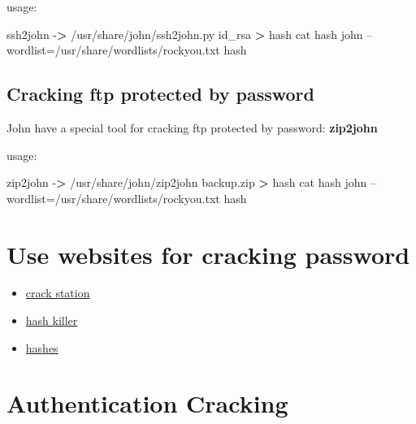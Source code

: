 \documentclass{assets/ipesethesis}
\newenvironment{Shaded}{\begin{snugshade}}{\end{snugshade}}
\newcommand{\ExtensionTok}[1]{#1}
\newcommand{\FunctionTok}[1]{\textcolor[rgb]{0.00,0.00,0.00}{#1}}
\newcommand{\NormalTok}[1]{#1}
\newcommand{\OperatorTok}[1]{\textcolor[rgb]{0.81,0.36,0.00}{\textbf{#1}}}
\providecommand{\tightlist}{%
  \setlength{\itemsep}{0pt}\setlength{\parskip}{0pt}}
\begin{document}
usage:

\begin{Shaded}
\begin{Highlighting}[]
\ExtensionTok{ssh2john}\NormalTok{ -}\OperatorTok{>}\NormalTok{ /usr/share/john/ssh2john.py id_rsa }\OperatorTok{>}\NormalTok{ hash}
\FunctionTok{cat}\NormalTok{ hash}
\ExtensionTok{john}\NormalTok{ --wordlist=/usr/share/wordlists/rockyou.txt hash}
\end{Highlighting}
\end{Shaded}

\hypertarget{cracking-ftp-protected-by-password}{%
\subsection*{Cracking ftp protected by password}\label{cracking-ftp-protected-by-password}}

John have a special tool for cracking ftp protected by password: \textbf{zip2john}

usage:

\begin{Shaded}
\begin{Highlighting}[]
\ExtensionTok{zip2john}\NormalTok{ -}\OperatorTok{>}\NormalTok{ /usr/share/john/zip2john backup.zip }\OperatorTok{>}\NormalTok{ hash}
\FunctionTok{cat}\NormalTok{ hash}
\ExtensionTok{john}\NormalTok{ --wordlist=/usr/share/wordlists/rockyou.txt hash}
\end{Highlighting}
\end{Shaded}

\hypertarget{use-websites-for-cracking-password}{%
\section*{Use websites for cracking password}\label{use-websites-for-cracking-password}}

\begin{itemize}
\tightlist
\item
  \href{https://crackstation.net}{crack station}
\item
  \href{https://hashkiller.io}{hash killer}
\item
  \href{https://hashes.com}{hashes}
\end{itemize}

\hypertarget{authentication-cracking}{%
\section*{Authentication Cracking}\label{authentication-cracking}}
\end{document}
